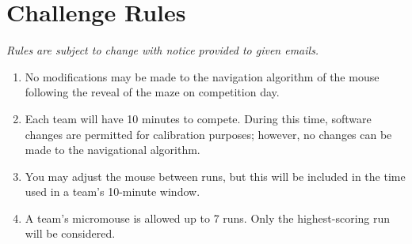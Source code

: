 \documentclass[a4paper,12pt]{article}
\begin{document}
\newpage
\section{Challenge Rules}
\begin{center}
    \emph{Rules are subject to change with notice provided to given emails.}
\end{center}
\begin{enumerate}
    \item No modifications may be made to the navigation algorithm of the mouse following the reveal of the maze on competition day.

    \item Each team will have 10 minutes to compete. During this time, software changes are permitted for calibration purposes; however, no changes can be made to the navigational algorithm.
    
    
    
    
    \item You may adjust the mouse between runs, but this will be included in the time used in a team's 10-minute window.
    
    \item A team's micromouse is allowed up to 7 runs. Only the highest-scoring run will be considered.
    

\end{enumerate}
\end{document}
